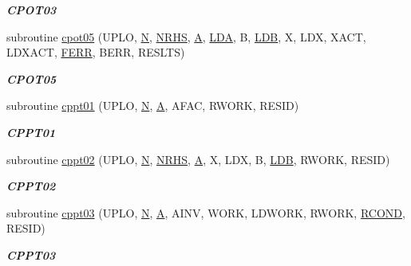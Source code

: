 \begin{DoxyCompactItemize}
\begin{DoxyCompactList}\small\item\em {\bfseries C\+P\+O\+T03} \end{DoxyCompactList}\item 
subroutine \hyperlink{group__complex__lin_ga0a9795b284bf62ac72daf25f927ff8aa}{cpot05} (U\+P\+L\+O, \hyperlink{polmisc_8c_a0240ac851181b84ac374872dc5434ee4}{N}, \hyperlink{example__user_8c_aa0138da002ce2a90360df2f521eb3198}{N\+R\+H\+S}, \hyperlink{classA}{A}, \hyperlink{example__user_8c_ae946da542ce0db94dced19b2ecefd1aa}{L\+D\+A}, B, \hyperlink{example__user_8c_a50e90a7104df172b5a89a06c47fcca04}{L\+D\+B}, X, L\+D\+X, X\+A\+C\+T, L\+D\+X\+A\+C\+T, \hyperlink{superlu__enum__consts_8h_af00a42ecad444bbda75cde1b64bd7e72a78fd14d7abebae04095cfbe02928f153}{F\+E\+R\+R}, B\+E\+R\+R, R\+E\+S\+L\+T\+S)
\begin{DoxyCompactList}\small\item\em {\bfseries C\+P\+O\+T05} \end{DoxyCompactList}\item 
subroutine \hyperlink{group__complex__lin_ga01db7bdd633a3b06fe5a70a0c5a5e18e}{cppt01} (U\+P\+L\+O, \hyperlink{polmisc_8c_a0240ac851181b84ac374872dc5434ee4}{N}, \hyperlink{classA}{A}, A\+F\+A\+C, R\+W\+O\+R\+K, R\+E\+S\+I\+D)
\begin{DoxyCompactList}\small\item\em {\bfseries C\+P\+P\+T01} \end{DoxyCompactList}\item 
subroutine \hyperlink{group__complex__lin_ga0178713a9e239d6fd86a6068f04830fa}{cppt02} (U\+P\+L\+O, \hyperlink{polmisc_8c_a0240ac851181b84ac374872dc5434ee4}{N}, \hyperlink{example__user_8c_aa0138da002ce2a90360df2f521eb3198}{N\+R\+H\+S}, \hyperlink{classA}{A}, X, L\+D\+X, B, \hyperlink{example__user_8c_a50e90a7104df172b5a89a06c47fcca04}{L\+D\+B}, R\+W\+O\+R\+K, R\+E\+S\+I\+D)
\begin{DoxyCompactList}\small\item\em {\bfseries C\+P\+P\+T02} \end{DoxyCompactList}\item 
subroutine \hyperlink{group__complex__lin_ga164a32baa8a6a7eec76962051e58119e}{cppt03} (U\+P\+L\+O, \hyperlink{polmisc_8c_a0240ac851181b84ac374872dc5434ee4}{N}, \hyperlink{classA}{A}, A\+I\+N\+V, W\+O\+R\+K, L\+D\+W\+O\+R\+K, R\+W\+O\+R\+K, \hyperlink{superlu__enum__consts_8h_af00a42ecad444bbda75cde1b64bd7e72a9b5c151728d8512307565994c89919d5}{R\+C\+O\+N\+D}, R\+E\+S\+I\+D)
\begin{DoxyCompactList}\small\item\em {\bfseries C\+P\+P\+T03} \end{DoxyCompactList}\item 

\end{DoxyCompactItemize}
